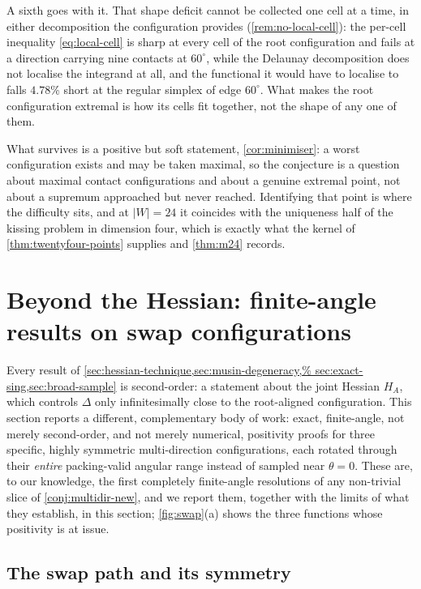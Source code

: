 \documentclass[11pt,reqno]{amsart}
\renewcommand{\_}{\origunderscore\allowbreak}
\numberwithin{equation}{section}
\theoremstyle{plain}
\theoremstyle{definition}
\theoremstyle{remark}
\newcommand{\defect}{\Delta}                 %
\begin{document}
A sixth goes with it. That shape deficit cannot be collected one cell at
a time, in either decomposition the configuration provides
(\cref{rem:no-local-cell}): the per-cell inequality \eqref{eq:local-cell}
is sharp at every cell of the root configuration and fails at a
direction carrying nine contacts at $60^\circ$, while the Delaunay
decomposition does not localise the integrand at all, and the functional
it would have to localise to falls $4.78\%$ short at the regular simplex
of edge $60^\circ$. What makes the root configuration extremal is how
its cells fit together, not the shape of any one of them.

What survives is a positive but soft statement,
\cref{cor:minimiser}: a worst configuration exists and may be taken
maximal, so the conjecture is a question about maximal contact
configurations and about a genuine extremal point, not about a
supremum approached but never reached. Identifying that point is where
the difficulty sits, and at $|W|=24$ it coincides with the uniqueness
half of the kissing problem in dimension four, which is exactly what
the kernel of \cref{thm:twentyfour-points} supplies and \cref{thm:m24}
records.
\section{Beyond the Hessian: finite-angle results on swap configurations}\label{sec:swap-configs}

Every result of \cref{sec:hessian-technique,sec:musin-degeneracy,%
sec:exact-sing,sec:broad-sample} is second-order: a statement about the
joint Hessian $H_A$, which controls $\defect$ only infinitesimally close
to the root-aligned configuration. This section reports a different,
complementary body of work: exact, finite-angle, not merely
second-order, and not merely numerical, positivity proofs for three
specific, highly symmetric multi-direction configurations, each rotated
through their \emph{entire} packing-valid angular range instead of sampled near $\theta=0$. These are, to our knowledge, the first
completely finite-angle resolutions of any non-trivial slice of
\cref{conj:multidir-new}, and we report them, together with the
limits of what they establish, in this section;
\cref{fig:swap}(a) shows the three functions whose positivity is at
issue.

\subsection{The swap path and its symmetry}\label{sec:swap-setup}
\end{document}
